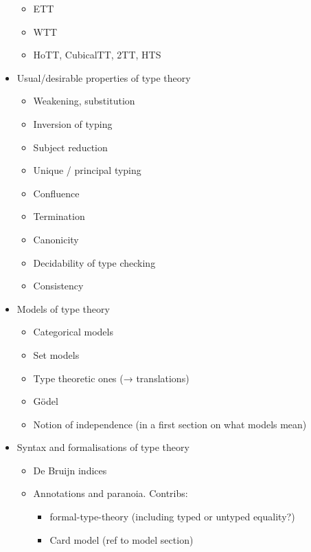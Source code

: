 \begin{itemize}
\begin{itemize}
      \item ETT
      \item WTT
      \item HoTT, CubicalTT, 2TT, HTS
    \end{itemize}
  \item Usual/desirable properties of type theory
    \begin{itemize}
      \item Weakening, substitution
      \item Inversion of typing
      \item Subject reduction
      \item Unique / principal typing
      \item Confluence
      \item Termination
      \item Canonicity
      \item Decidability of type checking
      \item Consistency
    \end{itemize}
  \item Models of type theory
    \begin{itemize}
      \item Categorical models
      \item Set models
      \item Type theoretic ones (→ translations)
      \item Gödel
      \item Notion of independence (in a first section on what models mean)
    \end{itemize}
  \item Syntax and formalisations of type theory
    \begin{itemize}
      \item De Bruijn indices
      \item Annotations and paranoia. Contribs:
        \begin{itemize}
          \item formal-type-theory (including typed or untyped equality?)
          \item Card model (ref to model section)
        \end{itemize}

\end{itemize}
\end{itemize}
